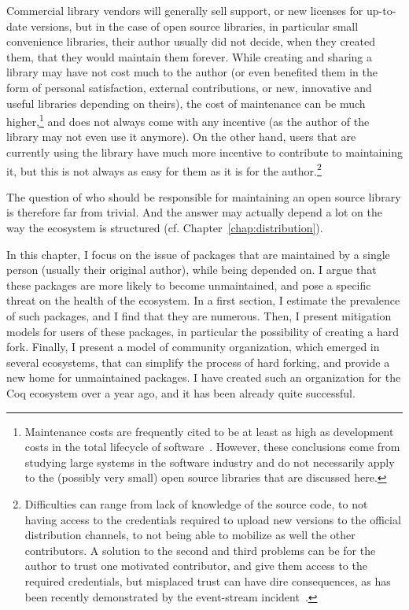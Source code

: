 Commercial library vendors will generally sell support, or new licenses for up-to-date versions, but in the case of open source libraries, in particular small convenience libraries, their author usually did not decide, when they created them, that they would maintain them forever.
While creating and sharing a library may have not cost much to the author (or even benefited them in the form of personal satisfaction, external contributions, or new, innovative and useful libraries depending on theirs), the cost of maintenance can be much higher,\footnote{
	Maintenance costs are frequently cited to be at least as high as development costs in the total lifecycle of software~\cite{lientz1981problems}.
	However, these conclusions come from studying large systems in the software	industry and do not necessarily apply to the (possibly very small) open source libraries that are discussed here.
}
and does not always come with any incentive (as the author of the library may not even use it anymore).
On the other hand, users that are currently using the library have much more incentive to contribute to maintaining it, but this is not always as easy for them as it is for the author.\footnote{
	Difficulties can range from lack of knowledge of the source code, to not having access to the credentials required to upload new versions to the official distribution channels, to not being able to mobilize as well the other contributors.
	A solution to the second and third problems can be for the author to trust one motivated contributor, and give them access to the required credentials, but misplaced trust can have dire consequences, as has been recently demonstrated by the event-stream incident~\cite{npm1,npm2}.
}

The question of who should be responsible for maintaining an open source library is therefore far from trivial.
And the answer may actually depend a lot on the way the ecosystem is structured (cf. Chapter~\ref{chap:distribution}).

In this chapter, I focus on the issue of packages that are maintained by a single person (usually their original author), while being depended on.
I argue that these packages are more likely to become unmaintained, and pose a specific threat on the health of the ecosystem.
In a first section, I estimate the prevalence of such packages, and I find that they are numerous.
Then, I present mitigation models for users of these packages, in particular the possibility of creating a hard fork.
Finally, I present a model of community organization, which emerged in several ecosystems, that can simplify the process of hard forking, and provide a new home for unmaintained packages.
I have created such an organization for the Coq ecosystem over a year ago, and it has been already quite successful.

